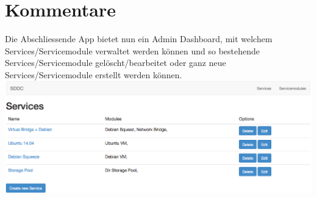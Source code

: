 \section{Kommentare}

Die Abschliessende App bietet nun ein Admin Dashboard, mit welchem 
Services/Servicemodule
verwaltet werden können und so bestehende Services/Servicemodule gelöscht/bearbeitet oder ganz 
neue Services/Servicemodule erstellt werden können.
\newline
\includegraphics[width=\textwidth]{./10_Protokolle/04_Testprotokoll/images/Sprint3/dashboard}

